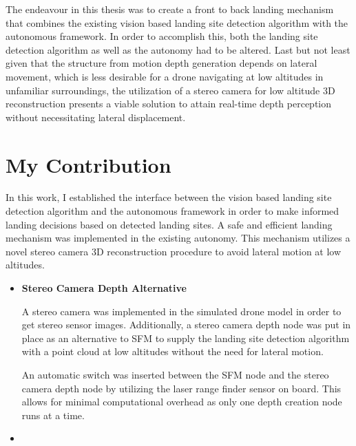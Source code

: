 The endeavour in this thesis was to create a front to back landing mechanism that combines the existing vision based landing site detection algorithm with the autonomous framework. In order to accomplish this, both the landing site detection algorithm as well as the autonomy had to be altered. Last but not least given that the structure from motion depth generation depends on lateral movement, which is less desirable for a drone navigating at low altitudes in unfamiliar surroundings, the utilization of a stereo camera for low altitude 3D reconstruction presents a viable solution to attain real-time depth perception without necessitating lateral displacement.

\section{My Contribution}
In this work, I established the interface between the vision based landing site detection algorithm and the autonomous framework in order to make informed landing decisions based on detected landing sites. A safe and efficient landing mechanism was implemented in the existing autonomy. This mechanism utilizes a novel stereo camera 3D reconstruction procedure to avoid lateral motion at low altitudes.

\begin{itemize}
    \item \textbf{Stereo Camera Depth Alternative}

    A stereo camera was implemented in the simulated drone model in order to get stereo sensor images. Additionally, a stereo camera depth node was put in place as an alternative to SFM to supply the landing site detection algorithm with a point cloud at low altitudes without the need for lateral motion. 

    An automatic switch was inserted between the SFM node and the stereo camera depth node by utilizing the laser range finder sensor on board. This allows for minimal computational overhead as only one depth creation node runs at a time.
    \item
\end{itemize}

